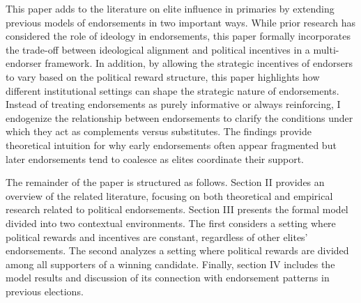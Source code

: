 This paper adds to the literature on elite influence in primaries by extending previous models of endorsements in two important ways. While prior research has considered the role of ideology in endorsements, this paper formally incorporates the trade-off between ideological alignment and political incentives in a multi-endorser framework. In addition, by allowing the strategic incentives of endorsers to vary based on the political reward structure, this paper highlights how different institutional settings can shape the strategic nature of endorsements. Instead of treating endorsements as purely informative or always reinforcing, I endogenize the relationship between endorsements to clarify the conditions under which they act as complements versus substitutes. The findings provide theoretical intuition for why early endorsements often appear fragmented but later endorsements tend to coalesce as elites coordinate their support.

The remainder of the paper is structured as follows. Section II provides an overview of the related literature, focusing on both theoretical and empirical research related to political endorsements. Section III presents the formal model divided into two contextual environments. The first considers a setting where political rewards and incentives are constant, regardless of other elites' endorsements. The second analyzes a setting where political rewards are divided among all supporters of a winning candidate. Finally, section IV includes the model results and discussion of its connection with endorsement patterns in previous elections.
